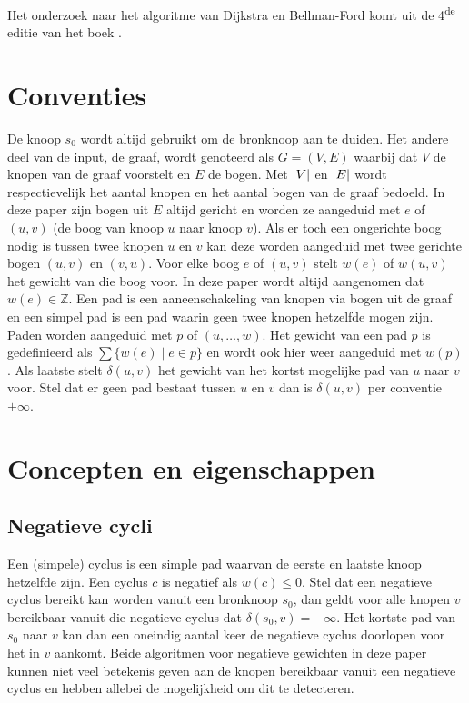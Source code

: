 \documentclass[conference]{IEEEtran}
\theoremstyle{definition}
\theoremstyle{remark}
\DeclarePairedDelimiter{\card}{\vert}{\vert}  %
\begin{document}
Het onderzoek naar het algoritme van Dijkstra en Bellman-Ford komt uit de 4\textsuperscript{de} editie van het boek  \cite{Introduction}.

\section{Conventies}
De knoop $s_0$ wordt altijd gebruikt om de bronknoop aan te duiden. %
Het andere deel van de input, de graaf, wordt genoteerd als $G = (V, E)$ waarbij dat $V$ de knopen van de graaf voorstelt en $E$ de bogen. Met $\card{V}$ en $\card{E}$ wordt respectievelijk het aantal knopen en het aantal bogen van de graaf bedoeld. In deze paper zijn bogen uit $E$ altijd gericht en worden ze aangeduid met $e$ of $(u, v)$ (de boog van knoop $u$ naar knoop $v$). Als er toch een ongerichte boog nodig is tussen twee knopen $u$ en $v$ kan deze worden aangeduid met twee gerichte bogen $(u, v)$ en $(v, u)$. Voor elke boog $e$ of $(u, v)$ stelt $w(e)$ of $w(u, v)$ het gewicht van die boog voor. In deze paper wordt altijd aangenomen dat $w(e) \in \mathbb{Z}$.
Een pad is een aaneenschakeling van knopen via bogen uit de graaf en een simpel pad is een pad waarin geen twee knopen hetzelfde mogen zijn. Paden worden aangeduid met $p$ of $(u, \dots, w)$. Het gewicht van een pad $p$ is gedefinieerd als $\sum\{w(e) \mid e \in p\}$ en wordt ook hier weer aangeduid met $w(p)$. Als laatste stelt $\delta(u, v)$ het gewicht van het kortst mogelijke pad van $u$ naar $v$ voor. Stel dat er geen pad bestaat tussen $u$ en $v$ dan is $\delta(u, v)$ per conventie $+ \infty$.

\section{Concepten en eigenschappen}
\subsection{Negatieve cycli}
Een (simpele) cyclus is een simple pad waarvan de eerste en laatste knoop hetzelfde zijn. Een cyclus $c$ is negatief als $w(c) \leq 0$. Stel dat een negatieve cyclus bereikt kan worden vanuit een bronknoop $s_0$, dan geldt voor alle knopen $v$ bereikbaar vanuit die negatieve cyclus dat $\delta(s_0, v) = - \infty$. Het kortste pad van $s_0$ naar $v$ kan dan een oneindig aantal keer de negatieve cyclus doorlopen voor het in $v$ aankomt. Beide algoritmen voor negatieve gewichten in deze paper kunnen niet veel betekenis geven aan de knopen bereikbaar vanuit een negatieve cyclus en hebben allebei de mogelijkheid om dit te detecteren.
\end{document}
